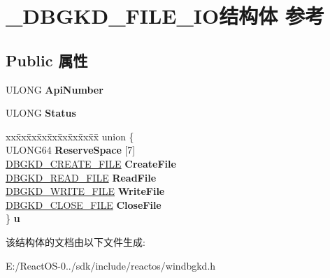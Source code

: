 \hypertarget{struct___d_b_g_k_d___f_i_l_e___i_o}{}\section{\+\_\+\+D\+B\+G\+K\+D\+\_\+\+F\+I\+L\+E\+\_\+\+I\+O结构体 参考}
\label{struct___d_b_g_k_d___f_i_l_e___i_o}
\subsection*{Public 属性}
\begin{DoxyCompactItemize}
\item 
\mbox{\label{struct___d_b_g_k_d___f_i_l_e___i_o_a7eee1cf6087e818211b220bd90a7fcc3}} 
U\+L\+O\+NG {\bfseries Api\+Number}
\item 
\mbox{\label{struct___d_b_g_k_d___f_i_l_e___i_o_a098de6619ef4e40a903621ab45655977}} 
U\+L\+O\+NG {\bfseries Status}
\item 
\mbox{\label{struct___d_b_g_k_d___f_i_l_e___i_o_afd7acc6b8fe6dd7ee6681e7f812e436a}} 
\begin{tabbing}
xx\=xx\=xx\=xx\=xx\=xx\=xx\=xx\=xx\=\kill
union \{\\
\>ULONG64 {\bfseries ReserveSpace} \mbox{[}7\mbox{]}\\
\>\hyperlink{struct___d_b_g_k_d___c_r_e_a_t_e___f_i_l_e}{DBGKD\_CREATE\_FILE} {\bfseries CreateFile}\\
\>\hyperlink{struct___d_b_g_k_d___r_e_a_d___f_i_l_e}{DBGKD\_READ\_FILE} {\bfseries ReadFile}\\
\>\hyperlink{struct___d_b_g_k_d___w_r_i_t_e___f_i_l_e}{DBGKD\_WRITE\_FILE} {\bfseries WriteFile}\\
\>\hyperlink{struct___d_b_g_k_d___c_l_o_s_e___f_i_l_e}{DBGKD\_CLOSE\_FILE} {\bfseries CloseFile}\\
\} {\bfseries u}\\

\end{tabbing}\end{DoxyCompactItemize}


该结构体的文档由以下文件生成\+:\begin{DoxyCompactItemize}
\item 
E\+:/\+React\+O\+S-\/0../sdk/include/reactos/windbgkd.\+h\end{DoxyCompactItemize}
